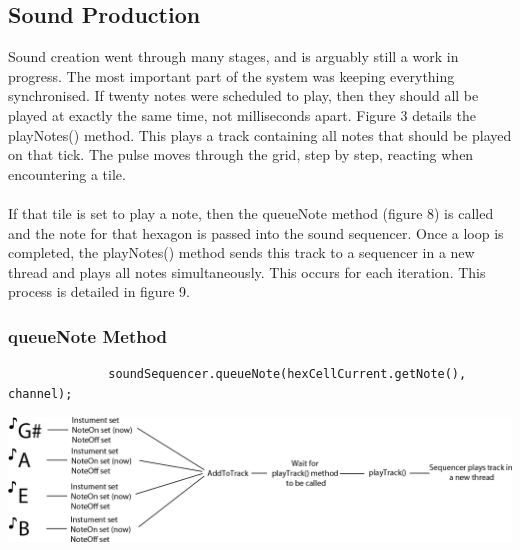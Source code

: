 \documentclass[10pt,a4paper]{article}
\begin{document}
\subsection{Sound Production}
Sound creation went through many stages, and is arguably still a work in progress. The most important part of the system was keeping everything synchronised. If twenty notes were scheduled to play, then they should all be played at exactly the same time, not milliseconds apart. Figure 3 details the playNotes() method. This plays a track containing all notes that should be played on that tick. The pulse moves through the grid, step by step, reacting when encountering a tile.\\
\\
If that tile is set to play a note, then the queueNote method (figure 8) is called and the note for that hexagon is passed into the sound sequencer. Once a loop is completed, the playNotes() method sends this track to a sequencer in a new thread and plays all notes simultaneously. This occurs for each iteration. This process is detailed in figure 9.\\
\subsubsection{queueNote Method}
\begin{center}
\begin{verbatim}
              soundSequencer.queueNote(hexCellCurrent.getNote(), channel);
\end{verbatim}
\medskip 
\includegraphics[scale=0.25]{8.png}
\end{center}
\end{document}
